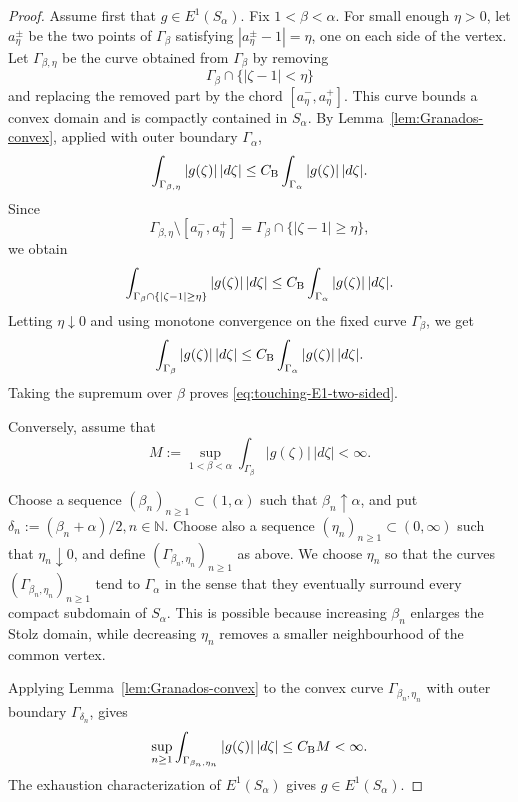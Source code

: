 \documentclass[11pt]{amsart}
\numberwithin{equation}{section}
\theoremstyle{definition}
\theoremstyle{plain}
\begin{document}
\begin{proof}
Assume first that \(g\in E^1(S_\alpha)\).  Fix \(1<\beta<\alpha\).  For
small enough \(\eta>0\), let \(a_\eta^\pm\) be the two points of \(\Gamma_\beta\)
satisfying \(|a_\eta^\pm-1|=\eta\), one on each side of the vertex.  Let
\(\Gamma_{\beta,\eta}\) be the curve obtained from \(\Gamma_\beta\) by
removing
\[
        \Gamma_\beta\cap\{|\zeta-1|<\eta\}
\]
and replacing the removed part by the chord \([a_\eta^-,a_\eta^+]\).  This
curve bounds a convex domain and is compactly contained in \(S_\alpha\).  By
Lem\-ma~\ref{lem:Granados-convex}, applied with outer boundary
\(\Gamma_\alpha\),
\[
        \int_{\Gamma_{\beta,\eta}}|g(\zeta)|\,|d\zeta|
        \le
        C_{\rm B}
        \int_{\Gamma_\alpha}|g(\zeta)|\,|d\zeta| .
\]
Since
\[
        \Gamma_{\beta,\eta}\setminus [a_\eta^-,a_\eta^+]
        =
        \Gamma_\beta\cap\{|\zeta-1|\ge\eta\},
\]
we obtain
\[
        \int_{\Gamma_\beta\cap\{|\zeta-1|\ge\eta\}}
        |g(\zeta)|\,|d\zeta|
        \le
        C_{\rm B}
        \int_{\Gamma_\alpha}|g(\zeta)|\,|d\zeta| .
\]
Letting \(\eta\downarrow0\) and using monotone convergence on the fixed curve
\(\Gamma_\beta\), we get
\[
        \int_{\Gamma_\beta}|g(\zeta)|\,|d\zeta|
        \le
        C_{\rm B}
        \int_{\Gamma_\alpha}|g(\zeta)|\,|d\zeta| .
\]
Taking the supremum over \(\beta\) proves 
\eqref{eq:touching-E1-two-sided}.

Conversely, assume that
\[
        M:=\sup_{1<\beta<\alpha}
        \int_{\Gamma_\beta}|g(\zeta)|\,|d\zeta|<\infty .
\]
  
Choose a sequence
\(
   (\beta_n)_{n\ge1}\subset(1,\alpha)
\)
such that \(\beta_n\uparrow\alpha\), and put
\(\delta_n:=(\beta_n+\alpha)/2, n \in \mathbb N\). Choose also a sequence
\(
   (\eta_n)_{n\ge1}\subset(0,\infty)
\)
such that \(\eta_n\downarrow0\), and define
\((\Gamma_{\beta_n,\eta_n})_{n \ge 1}\) as above.
We choose \(\eta_n\) so that the curves
\((\Gamma_{\beta_n,\eta_n})_{n \ge 1}\) tend to \(\Gamma_\alpha\) in the sense that they
eventually surround every compact subdomain of \(S_\alpha\).  This is possible
because increasing \(\beta_n\) enlarges the Stolz domain, while decreasing
\(\eta_n\) removes a smaller neighbourhood of the common vertex.

Applying Lemma~\ref{lem:Granados-convex} to the convex curve $\Gamma_{\beta_n,\eta_n}$ with outer boundary
\(\Gamma_{\delta_n}\), gives
\[
        \sup_{n\ge 1} \int_{\Gamma_{\beta_n,\eta_n}}
        |g(\zeta)|\,|d\zeta|
        \le C_{\rm B}M<\infty .
\]
The exhaustion characterization of \(E^1(S_\alpha)\) gives
\(g\in E^1(S_\alpha)\). 


\end{proof}
\end{document}
